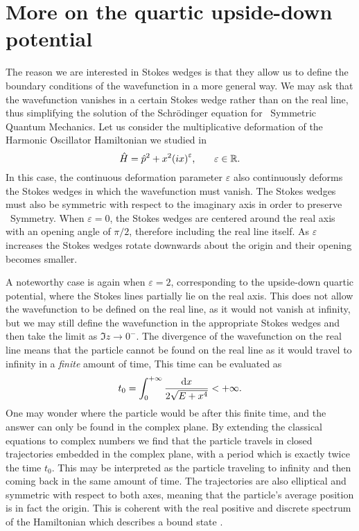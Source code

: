     \section*{More on the quartic upside-down potential}
        The reason we are interested in Stokes wedges is that they allow us to define the boundary conditions of the wavefunction in a more general way. We may ask that the wavefunction vanishes in a certain Stokes wedge rather than on the real line, thus simplifying the solution of the Schr\"odinger equation for \PT\ Symmetric Quantum Mechanics. Let us consider the multiplicative deformation of the Harmonic Oscillator Hamiltonian we studied in 
        \begin{equation*}
            \hH = \hp^2 + x^2\pqty{i x}^\varepsilon
            \mycomma \qquad
            \varepsilon \in \bbR 
            \myperiod
        \end{equation*}
        In this case, the continuous deformation parameter $\varepsilon$ also continuously deforms the Stokes wedges in which the wavefunction must vanish. The Stokes wedges must also be symmetric with respect to the imaginary axis in order to preserve \PT\ Symmetry. When $\varepsilon = 0$, the Stokes wedges are centered around the real axis with an opening angle of $\pi/2$, therefore including the real line itself. As $\varepsilon$ increases the Stokes wedges rotate downwards about the origin and their opening becomes smaller.

        A noteworthy case is again when $\varepsilon = 2$, corresponding to the upside-down quartic potential, where the Stokes lines partially lie on the real axis. This does not allow the wavefunction to be defined on the real line, as it would not vanish at infinity, but we may still define the wavefunction in the appropriate Stokes wedges and then take the limit as $\Im z \to 0^-$. The divergence of the wavefunction on the real line means that the particle cannot be found on the real line as it would travel to infinity in a \emph{finite} amount of time, This time can be evaluated as
        \begin{equation*}
            t_0 = \int_{0}^{+\infty} \frac{\dd{x}}{2\sqrt{E + x^4}} < +\infty
            \text{.}
        \end{equation*}
        One may wonder where the particle would be after this finite time, and the answer can only be found in the complex plane. By extending the classical equations to complex numbers we find that the particle travels in closed trajectories embedded in the complex plane, with a period which is exactly twice the time $t_0$. This may be interpreted as the particle traveling to infinity and then coming back in the same amount of time. The trajectories are also elliptical and symmetric with respect to both axes, meaning that the particle's average position is in fact the origin. This is coherent with the real positive and discrete spectrum of the Hamiltonian which describes a bound state \cite{bender2024}.